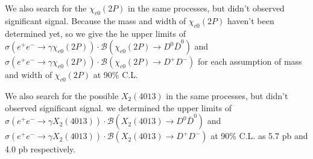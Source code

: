\documentclass[aps,preprint,tightenlines,superscriptaddress,showpacs,byrevtex,amsmath,amssymb,nofloatfix]{revtex4}
\begin{document}
We also search for the $\chi_{c0} (2P)$ in the same processes, but didn't observed significant signal. Because the mass and width of $\chi_{c0} (2P)$ haven't been determined yet, so we give the he upper limits of $\sigma(e^{+}e^{-}\rightarrow \gamma \chi_{c0} (2P)) \cdot \mathcal{B}(\chi_{c0} (2P)\rightarrow  D^{0}\bar{D}^{0})$ and  $\sigma(e^{+}e^{-}\rightarrow \gamma \chi_{c0} (2P)) \cdot \mathcal{B}(\chi_{c0} (2P)\rightarrow  D^{+}D^{-})$ for each assumption of  mass and width of $\chi_{c0} (2P)$ at 90\% C.L.


We also search for the possible $X_{2}(4013)$ in the same processes, but didn't observed significant signal. we determined  the upper limits of $\sigma(e^{+}e^{-}\rightarrow \gamma X_{2}(4013)) \cdot \mathcal{B}(X_{2}(4013)\rightarrow  D^{0}\bar{D}^{0})$ and  $\sigma(e^{+}e^{-}\rightarrow \gamma X_{2}(4013)) \cdot \mathcal{B}(X_{2}(4013)\rightarrow  D^{+}D^{-})$  at 90\% C.L. as 5.7 pb and 4.0 pb respectively.





\clearpage
\end{document}
